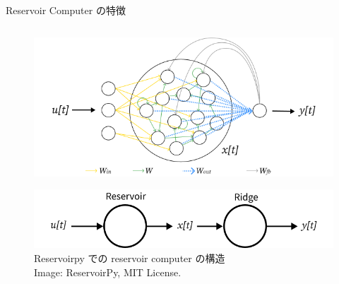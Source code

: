 \begin{frame}{Reservoir Computer の特徴}
\begin{columns}[T]
\begin{column}{.5\textwidth}
        \begin{figure}
            \includegraphics[width=\textwidth]{Fig/esn.svg.png}
        \end{figure}  
        \begin{figure}
            \includegraphics[width=\textwidth]{Fig/esn_nodes.svg.png}
            \caption{\scriptsize{Reservoirpy での reservoir computer の構造}\\ \tiny{Image: ReservoirPy, MIT License.}}
        \end{figure}  
      \end{column}
    \end{columns}
  \end{frame}


